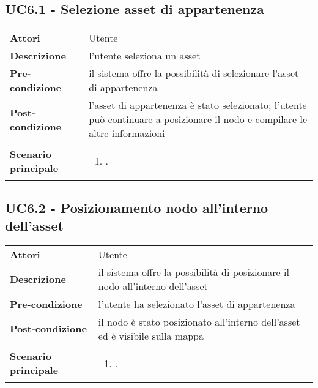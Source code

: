 \subsection{UC6.1 - Selezione asset di appartenenza} 
\label{sssec:UC6.1} 
\def\arraystretch{1.5}
\begin{tabularx}{\textwidth}{l|p{}}
	\rowcolor{I} \multicolumn{2}{c}{\color{white}\textbf{UC6.1 - Selezione asset di appartenenza}} \\
	\toprule
	\endhead
	\textbf{Attori} & Utente\\
	\textbf{Descrizione} & l'utente seleziona un asset\\
	\textbf{Pre-condizione} & il sistema offre la possibilità di selezionare l'asset di appartenenza\\
	\textbf{Post-condizione} & l'asset di appartenenza è stato selezionato; l'utente può continuare a posizionare il nodo e compilare le altre informazioni\\
	\textbf{Scenario principale} & \vspace{-1.2em}\begin{enumerate}[leftmargin=*,noitemsep,nosep]
		\item \nameref{sssec:UC6.1}.
	\end{enumerate}\\
	\bottomrule
\end{tabularx}

\subsection{UC6.2 - Posizionamento nodo all'interno dell'asset} 
\label{sssec:UC6.2} 
\def\arraystretch{1.5}
\begin{tabularx}{\textwidth}{l|p{}}
	\rowcolor{I} \multicolumn{2}{c}{\color{white}\textbf{UC6.2 - Posizionamento nodo all'interno dell'asset}} \\
	\toprule
	\endhead
	\textbf{Attori} & Utente\\
	\textbf{Descrizione} & il sistema offre la possibilità di posizionare il nodo all'interno dell'asset\\
	\textbf{Pre-condizione} & l'utente ha selezionato l'asset di appartenenza\\
	\textbf{Post-condizione} & il nodo è stato posizionato all'interno dell'asset ed è visibile sulla mappa\\
	\textbf{Scenario principale} & \vspace{-1.2em}\begin{enumerate}[leftmargin=*,noitemsep,nosep]
		\item \nameref{sssec:UC6.2}.
	\end{enumerate}\\
	\bottomrule
\end{tabularx}
